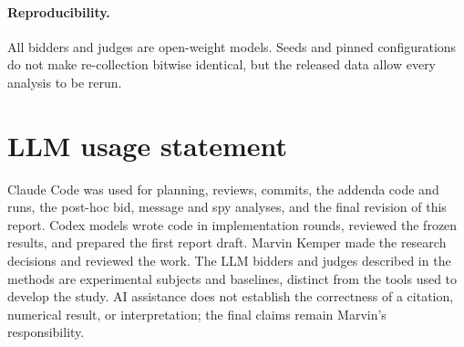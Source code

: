 \paragraph{Reproducibility.}
All bidders and judges are open-weight models. Seeds and pinned
configurations do not make re-collection bitwise identical, but the released
data allow every analysis to be rerun.

\section{LLM usage statement}
Claude Code was used for planning, reviews, commits, the addenda code and
runs, the post-hoc bid, message and spy analyses, and the final revision of
this report. Codex models wrote code in
implementation rounds, reviewed the frozen results, and prepared the first
report draft. Marvin Kemper made the research decisions and reviewed the work.
The LLM bidders and judges described in the methods are experimental
subjects and baselines, distinct from the tools used to develop the study.
AI assistance does not establish the correctness of a citation, numerical
result, or interpretation; the final claims remain Marvin's responsibility.
